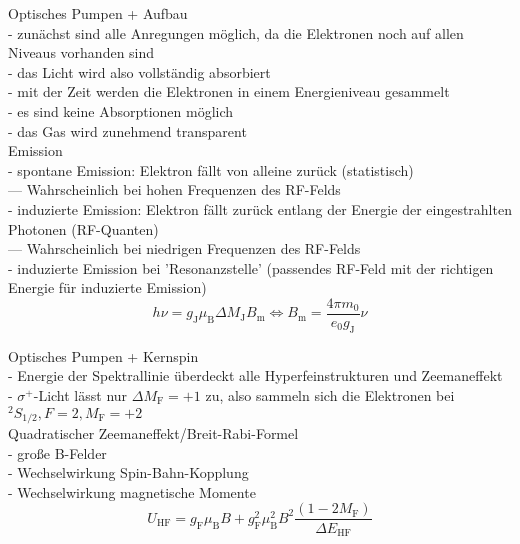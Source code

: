 Optisches Pumpen + Aufbau\\
- zunächst sind alle Anregungen möglich, da die Elektronen noch auf allen Niveaus vorhanden sind\\
- das Licht wird also vollständig absorbiert\\
- mit der Zeit werden die Elektronen in einem Energieniveau gesammelt\\
- es sind keine Absorptionen möglich\\
- das Gas wird zunehmend transparent\\

Emission\\
- spontane Emission: Elektron fällt von alleine zurück (statistisch)\\
  --- Wahrscheinlich bei hohen Frequenzen des RF-Felds\\
- induzierte Emission: Elektron fällt zurück entlang der Energie der eingestrahlten Photonen (RF-Quanten)\\
  --- Wahrscheinlich bei niedrigen Frequenzen des RF-Felds\\
- induzierte Emission bei 'Resonanzstelle' (passendes RF-Feld mit der richtigen Energie für induzierte Emission)\\
\begin{equation}
  h \nu = g_{\text{J}} \mu_{\text{B}} \Delta M_{\text{J}} B_{\text{m}} \Leftrightarrow B_{\text{m}} = \frac{4 \pi m_{0}}{e_{0} g_{\text{J}}} \nu
\label{eqn:resonanz}
\end{equation}

Optisches Pumpen + Kernspin\\
- Energie der Spektrallinie überdeckt alle Hyperfeinstrukturen und Zeemaneffekt\\
- $\sigma^{+}$-Licht lässt nur $\Delta M_{\text{F}}= +1$ zu, also sammeln sich die Elektronen bei $^{2}S_{1/2}, F=2, M_{\text{F}}=+2$ \\

Quadratischer Zeemaneffekt/Breit-Rabi-Formel\\
- große B-Felder\\
- Wechselwirkung Spin-Bahn-Kopplung\\
- Wechselwirkung magnetische Momente\\
\begin{equation}
U_{\text{HF}}= g_{\text{F}} \mu_{\text{B}} B + g_{\text{F}}^2 \mu_{\text{B}}^2 B^2 \frac{(1- 2M_{\text{F}})}{\Delta E_{\text{HF}}}
\label{eqn:quadzeeman}
\end{equation}
